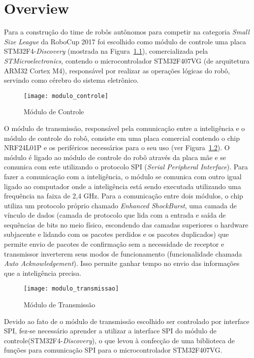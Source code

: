 \chapter{Overview}\label{cap:overview}

Para a construção do time de robôs autônomos para competir na categoria \textit{Small Size League}  da RoboCup 2017 foi escolhido como módulo de controle uma placa STM32F4-\textit{Discovery} (mostrada na Figura~\ref{fig:modulo_controle}), comercializada pela \textit{STMicroelectronics\textsuperscript{\textregistered}}, contendo o microcontrolador STM32F407VG (de arquitetura ARM32 Cortex M4), responsável por realizar as operações lógicas do robô, servindo como cérebro do sistema eletrônico.

\begin{figure}[H]
  \centering
  \texttt{[image: modulo\_controle]}
  \caption{Módulo de Controle}\label{fig:modulo_controle}
\end{figure}

O módulo de transmissão, responsável pela comunicação entre a inteligência e o módulo de controle do robô, consiste em uma placa comercial contendo o chip NRF24L01P e os periféricos necessários para o seu uso (ver Figura~\ref{fig:modulo_transmissao}). O módulo é ligado ao módulo de controle do robô através da placa mãe e se comunica com este utilizando o protocolo SPI (\textit{Serial Peripheral Interface}). Para fazer a comunicação com a inteligência, o módulo se comunica com outro igual ligado ao computador onde a inteligência está sendo executada utilizando uma frequência na faixa de 2,4 GHz. Para a comunicação entre dois módulos, o chip utiliza um protocolo próprio chamado \textit{Enhanced ShockBurst\textsuperscript{\texttrademark}}, uma camada de vínculo de dados (camada de protocolo que lida com a entrada e saída de sequências de bits no meio físico, escondendo das camadas superiores o hardware subjacente e lidando com os pacotes perdidos e os pacotes duplicados) que permite envio de pacotes de confirmação sem a necessidade de receptor e transmissor inverterem seus modos de funcionamento (funcionalidade chamada \textit{Auto Acknowledgement}).
Isso permite ganhar tempo no envio das informações que a inteligência precisa.

\begin{figure}[H]
  \centering
  \texttt{[image: modulo\_transmissao]}
  \caption{Módulo de Transmissão}\label{fig:modulo_transmissao}
\end{figure}

Devido ao fato de o módulo de transmissão escolhido ser controlado por interface SPI, fez-se necessário aprender a utilizar a interface SPI do módulo de controle(STM32F4-\textit{Discovery}), o que levou à confecção de uma  biblioteca de funções para comunicação SPI para o microcontrolador STM32F407VG.


